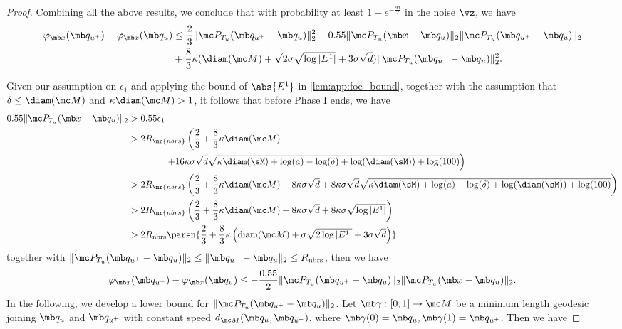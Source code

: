 \begin{proof}
Combining all the above results, we conclude that with probability at least $1-e^{-\frac{9d}{2}}$ in the noise $\vz$, we have 
\begin{equation}
    \begin{aligned}
        \varphi_{\mb x}(\mb q_{u^+}) - \varphi_{\mb x}(\mb q_u)
        &\leq \frac{2}{3} \| \mc P_{T_u}(\mb q_{u^+} - \mb q_u) \|_2^2 - 0.55 \| \mc P_{T_u}(\mb x - \mb q_u) \|_2 \| \mc P_{T_u}(\mb q_{u^+} - \mb q_u) \|_2\\ 
        &+ \frac{8}{3} \kappa (\diam(\mc M) + \sqrt{2} \sigma \sqrt{\log |E^1|} + 3\sigma\sqrt{d}) \| \mc P_{T_u}(\mb q_{u^+} - \mb q_u) \|_2^2.
    \end{aligned}
\end{equation}

Given our assumption on $\epsilon_1$ and applying the bound of $\abs{E^1}$ in \cref{lem:app:foe_bound}, together with the assumption that $\delta \leq \diam(\mc M)$ and $\kappa \diam(\mc M)>1$, it follows that before Phase I ends, we have 
\begin{equation}
\begin{aligned}
0.55 \| \mc P_{T_u}(\mb x - \mb q_u) \|_2
&> 0.55 \epsilon_1\\
&> 2R_{\mr{nbrs}}\left(\frac{2}{3} + \frac{8}{3}\kappa \diam(\mc M) + \right.\\
      &\qquad \qquad \left. + 16\kappa\sigma\sqrt{d}\sqrt{\kappa \diam(\sM) + \log(a) - \log(\delta) + \log(\diam(\sM)) + \log(100)}\right)\\
&> 2R_{\mr{nbrs}} \left( \frac{2}{3} + \frac{8}{3}\kappa \diam({\mc M}) + 8\kappa \sigma \sqrt{d} + 8\kappa\sigma\sqrt{d}\sqrt{\kappa \diam(\sM) + \log(a) - \log(\delta) + \log(\diam(\sM)) + \log(100)}\right)\\
&> 2R_{\mr{nbrs}} \left( \frac{2}{3} + \frac{8}{3}\kappa \diam({\mc M}) + 8\kappa \sigma \sqrt{d} + 8\kappa\sigma \sqrt{\log|E^1|}\right)\\
&>2R_{\text{nbrs}}\paren{\frac{2}{3} + \frac{8}{3}\kappa \left(\mathrm{diam}(\mc M) + \sigma\sqrt{2\log\left|E^1\right|} + 3\sigma\sqrt{d}\right)},
\end{aligned}
\end{equation}
together with $\| \mc P_{T_u}(\mb q_{u^+} - \mb q_u) \|_2 \leq \|\mb q_{u^+}-\mb q_u\|_2 \le R_{\text{nbrs}}$, then we have 
\begin{equation}\label{eq: bound of sufficient decrease in each step}
    \varphi_{\mb x}(\mb q_{u^+}) - \varphi_{\mb x}(\mb q_u) 
    \le -\frac{0.55}{2} \| \mc P_{T_u}(\mb q_{u^+} - \mb q_u) \|_2 \| \mc P_{T_u}(\mb x - \mb q_u) \|_2.
\end{equation}
In the following, we develop a lower bound for $\| \mc P_{T_u}(\mb q_{u^+} - \mb q_u) \|_2$.
Let $\mb\gamma:[0,1] \rightarrow \mc M$ be a minimum length geodesic joining $\mb q_u$ and $\mb q_{u^+}$ with constant speed $d_{\mc M}(\mb q_u, \mb q_{u^+})$, where $\mb\gamma(0)=\mb q_u, \mb\gamma(1)=\mb q_{u^+}$. Then we have


\end{proof}
